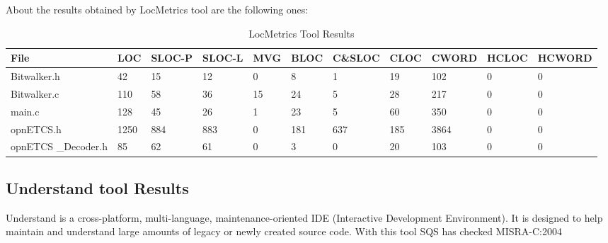 About the results obtained by LocMetrics tool are the following ones:

\begin{longtable}{||p{}|p{}|p{}|p{}|p{}|p{}|p{}|p{}|p{}|p{}|p{}||}
  \caption{LocMetrics Tool Results}\\
    \hline\hline
    \textbf{File} & LOC &  SLOC-P & SLOC-L & MVG & BLOC & C\&SLOC & CLOC & CWORD & HCLOC & HCWORD \\
    \hline\hline
    \endhead
    \hline\hline
    \endfoot
    Bitwalker.h &
    42 & 15 & 12 & 0 & 8 & 1 & 19 & 102 & 0 & 0
    \\
    \hline
    Bitwalker.c &
    110 & 58 & 36 & 15 & 24 & 5 & 28 & 217 & 0 & 0
    \\
    \hline
    main.c &
    128 & 45 & 26 & 1 & 23 & 5 & 60 & 350 & 0 & 0
    \\
    \hline
    opnETCS.h &
    1250 & 884 & 883 & 0 & 181 & 637 & 185 & 3864 & 0 & 0
    \\
    \hline
    opnETCS
    \_Decoder.h &
    85 & 62 & 61 & 0 & 3 & 0 & 20 & 103 & 0 & 0
    \\
    \hline
\end{longtable}

\subsection{Understand tool Results}
Understand is a cross-platform, multi-language, maintenance-oriented IDE (Interactive Development Environment). It is designed to help maintain and understand large amounts of legacy or newly created source code. With this tool SQS has checked MISRA-C:2004

